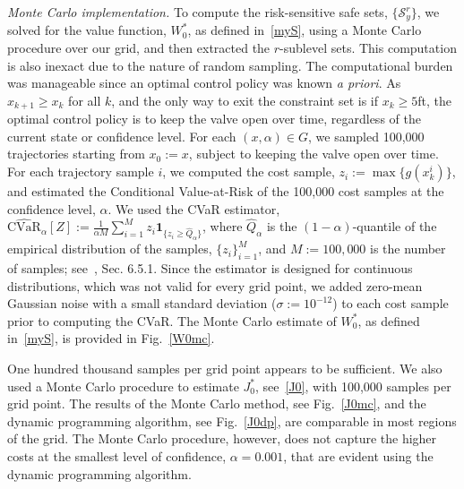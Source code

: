 \documentclass[letterpaper, 10 pt, conference]{ieeeconf}  %
\begin{document}
\textit{Monte Carlo implementation.}
To compute the risk-sensitive safe sets, $\{\mathcal{S}_y^r\}$,
we solved for the value function, $W_0^*$, as defined in~\eqref{myS}, using a Monte Carlo procedure over our grid,
and then extracted the $r$-sublevel sets.
This computation is also inexact due to the nature of random sampling. 
The computational burden was manageable since an optimal control policy was known \textit{a priori}.
As $x_{k+1}\geq x_k$ for all $k$, and the only way to exit the constraint set is if $x_k \geq 5$ft,
the optimal control policy is to keep the valve open over time, regardless of the current state or confidence level.
For each $(x,\alpha) \in G$, we sampled 100,000 trajectories starting from $x_0 := x$, subject to keeping the valve open over time.
For each trajectory sample $i$, we computed the cost sample, $z_i := \max\{g(x_k^i)\}$, and estimated the Conditional Value-at-Risk
of the 100,000 cost samples at the confidence level, $\alpha$. 
We used the CVaR estimator, $\hat{\text{CVaR}}_\alpha[Z] := \frac{1}{\alpha M}\sum_{i=1}^M z_i \textbf{1}_{\{z_i\geq \hat{Q}_\alpha\}}$,
where $\hat{Q}_\alpha$ is the $(1-\alpha)$-quantile of the empirical distribution of the samples, $\{z_i\}_{i=1}^M$,
and $M := 100,000$ is the number of samples; see~\cite{shapiro2009lectures}, Sec. 6.5.1.
Since the estimator is designed for continuous distributions, which was not valid for every grid point,
we added zero-mean Gaussian noise with a small standard deviation ($\sigma := 10^{-12}$) to each cost sample prior to computing the CVaR.
The Monte Carlo estimate of $W_0^*$, as defined in~\eqref{myS}, is provided in Fig.~\ref{W0mc}.

One hundred thousand samples per grid point appears to be sufficient. We also used a Monte Carlo procedure to estimate $J_0^*$, see~\eqref{J0},
with 100,000 samples per grid point.\footnotemark
{}
The results of the Monte Carlo method, see Fig.~\ref{J0mc}, and the dynamic programming algorithm, see Fig.~\ref{J0dp}, are comparable
in most regions of the grid. The Monte Carlo procedure, however, does not capture the higher costs at the smallest level of confidence, $\alpha = 0.001$,
that are evident using the dynamic programming algorithm.   
\end{document}
